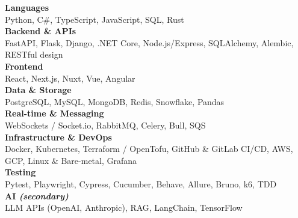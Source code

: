 
\textbf{\textcolor{emphasis}{Languages}} \\
Python, C\#, TypeScript, JavaScript, SQL, Rust \\[4pt]

\textbf{\textcolor{emphasis}{Backend \& APIs}} \\
FastAPI, Flask, Django, .NET Core, Node.js/Express, SQLAlchemy, Alembic, RESTful design \\[4pt]

\textbf{\textcolor{emphasis}{Frontend}} \\
React, Next.js, Nuxt, Vue, Angular \\[4pt]

\textbf{\textcolor{emphasis}{Data \& Storage}} \\
PostgreSQL, MySQL, MongoDB, Redis, Snowflake, Pandas \\[4pt]

\textbf{\textcolor{emphasis}{Real-time \& Messaging}} \\
WebSockets / Socket.io, RabbitMQ, Celery, Bull, SQS \\[4pt]

\textbf{\textcolor{emphasis}{Infrastructure \& DevOps}} \\
Docker, Kubernetes, Terraform / OpenTofu, GitHub \& GitLab CI/CD, AWS, GCP, Linux \& Bare-metal, Grafana \\[4pt]

\textbf{\textcolor{emphasis}{Testing}} \\
Pytest, Playwright, Cypress, Cucumber, Behave, Allure, Bruno, k6, TDD \\[4pt]

\textbf{\textcolor{emphasis}{AI \emph{(secondary)}}} \\
LLM APIs (OpenAI, Anthropic), RAG, LangChain, TensorFlow
